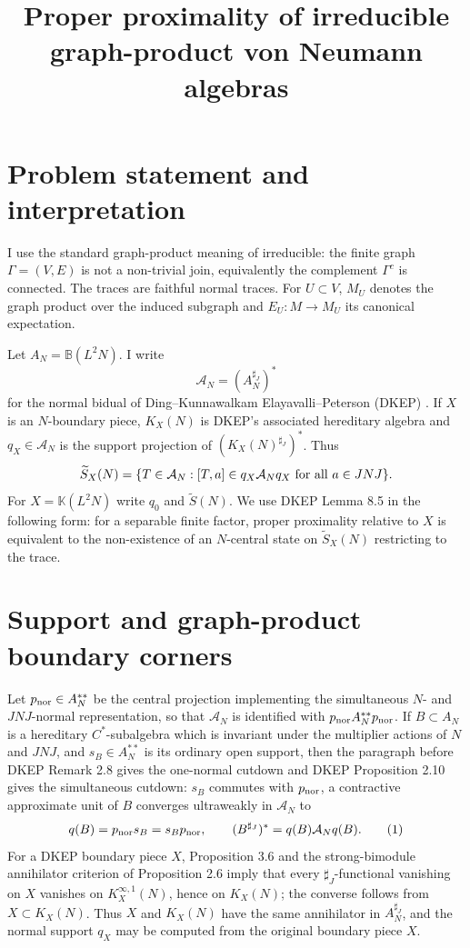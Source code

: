 \documentclass[12pt]{article}
\newcommand{\cA}{\mathcal A}
\begin{document}
\title{Proper proximality of irreducible graph-product von Neumann algebras}
\author{}
\date{}
\maketitle

\section*{Problem statement and interpretation}

I use the standard graph-product meaning of irreducible: the finite graph
\(\Gamma=(V,E)\) is not a non-trivial join, equivalently the complement
\(\Gamma^c\) is connected.  The traces are faithful normal traces.  For
\(U\subset V\), \(M_U\) denotes the graph product over the induced subgraph and
\(E_U:M\to M_U\) its canonical expectation.

Let \(A_N=\mathbb B(L^2N)\).  I write
\[
        \cA_N=(A_N^{\sharp_J})^*
\]
for the normal bidual of Ding--Kunnawalkam Elayavalli--Peterson (DKEP)
\cite{DKEP}.  If \(X\) is an \(N\)-boundary piece, \(K_X(N)\) is DKEP's
associated hereditary algebra and \(q_X\in\cA_N\) is the support projection of
\((K_X(N)^{\sharp_J})^*\).  Thus
\[
 \widetilde S_X(N)=
 \{T\in\cA_N:[T,a]\in q_X\cA_Nq_X\hbox{ for all }a\in JNJ\}.
\]
For \(X=\mathbb K(L^2N)\) write \(q_0\) and \(\widetilde S(N)\).  We use DKEP
Lemma 8.5 in the following form: for a separable finite factor, proper
proximality relative to \(X\) is equivalent to the non-existence of an
\(N\)-central state on \(\widetilde S_X(N)\) restricting to the trace.

\section*{Support and graph-product boundary corners}

Let \(p_{\rm nor}\in A_N^{**}\) be the central projection implementing the
simultaneous \(N\)- and \(JNJ\)-normal representation, so that
\(\cA_N\) is identified with \(p_{\rm nor}A_N^{**}p_{\rm nor}\).  If
\(B\subset A_N\) is a hereditary \(C^*\)-subalgebra which is invariant under
the multiplier actions of \(N\) and \(JNJ\), and \(s_B\in A_N^{**}\) is its
ordinary open support, then the paragraph before DKEP Remark 2.8 gives the
one-normal cutdown and DKEP Proposition 2.10 gives the simultaneous cutdown:
\(s_B\) commutes with \(p_{\rm nor}\), a contractive approximate unit of \(B\)
converges ultraweakly in \(\cA_N\) to
\[
        q(B)=p_{\rm nor}s_B=s_Bp_{\rm nor},
        \qquad
        (B^{\sharp_J})^*=q(B)\cA_Nq(B).                         \tag{1}
\]
For a DKEP boundary piece \(X\), Proposition 3.6 and the strong-bimodule
annihilator criterion of Proposition 2.6 imply that every
\(\sharp_J\)-functional vanishing on \(X\) vanishes on \(K_X^{\infty,1}(N)\),
hence on \(K_X(N)\); the converse follows from \(X\subset K_X(N)\).  Thus \(X\)
and \(K_X(N)\) have the same annihilator in \(A_N^{\sharp_J}\), and the normal
support \(q_X\) may be computed from the original boundary piece \(X\).
\end{document}
